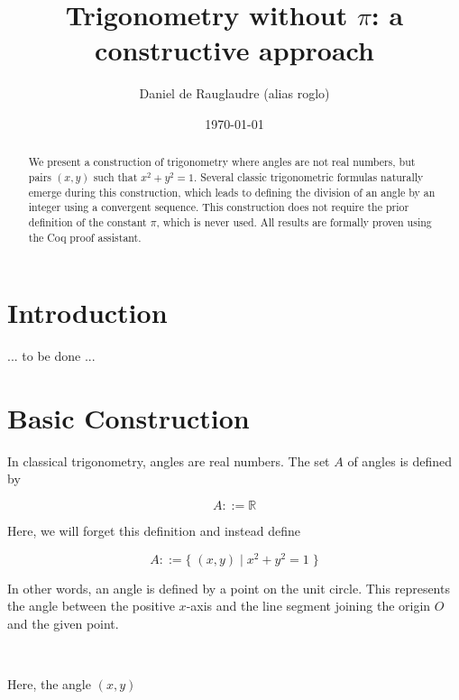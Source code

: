\documentclass[11pt]{article}
\title{Trigonometry without $\pi$: a constructive approach}
\author{Daniel de Rauglaudre (alias roglo)}
\date{\today}
\begin{document}
\maketitle

\begin{abstract}
We present a construction of trigonometry where angles are not real
numbers, but pairs $(x,y)$ such that $x^2 + y^2 = 1$. Several classic
trigonometric formulas naturally emerge during this construction,
which leads to defining the division of an angle by an integer using a
convergent sequence. This construction does not require the prior
definition of the constant $\pi$, which is never used. All results are
formally proven using the Coq proof assistant.
\end{abstract}

\section{Introduction}

... to be done ...

\section{Basic Construction}

In classical trigonometry, angles are real numbers. The set \( A \) of
angles is defined by

\[
A ::= \mathbb{R}
\]

\noindent Here, we will forget this definition and instead define

\[
A ::= \{ \; (x, y) \; | \; x^2 + y^2 = 1 \; \}
\]

\noindent In other words, an angle is defined by a point on the unit
circle. This represents the angle between the positive \( x \)-axis
and the line segment joining the origin \( O \) and the given point.

\

\noindent Here, the angle $(x, y)$

\

\end{document}
